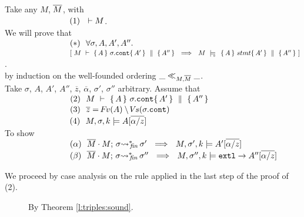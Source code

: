 {\noindent
Take any $M$, $\overline{M}$, with\\ 
$\strut \ \ \hspace{2.3cm} \ \ (1) \ \ \vdash M $.
\\
We will prove that\\
$\strut \ \ \hspace{2.3cm} \ \ (*)\ \ \forall \sigma, A, A', A''.$\\
$\strut \ \ \hspace{2.3cm} \ \ \ \ \  \ \ [ \ M\ \vdash\  \quadruple {A} {\sigma.\prg{cont}} {A'} {A''}  \ \ \Longrightarrow \ \    M\ \modelsD\  \quadruple {A} {stmt} {A'} {A''}\ ]$.\\
by induction on the well-founded ordering  $\_ \ll_{M,\overline{M}}  \_$.
\\
Take $\sigma$, $A$, $A'$, $A''$, $\overline z$, $\overline \alpha$, $\sigma'$, $\sigma''$  arbitrary. Assume that\\
$\strut \ \ \hspace{2.3cm} \ \ (2) \ \ M\ \vdash\  \quadruple {A} {\sigma.\prg{cont}} {A'} {A''}$\\
$\strut \ \ \hspace{2.3cm} \ \ (3) \ \ \overline z = \fv(A)\setminus \vs(\sigma.\prg{cont})$\\
$\strut \ \ \hspace{2.3cm} \ \ (4) \ \ \satDAssertFrom M  \sigma k   A[\overline{\alpha/z}]$\\
To show\\
$\strut \ \ \hspace{2.3cm} \ \ (\alpha) \ \    \leadstoBoundedStarFin {\Mtwo\cdot M}  {\sigma}  {\sigma'}\ \ \Longrightarrow\ \     \satDAssertFrom M  {\sigma'} k   A'[\overline{\alpha/z}]$\\
$\strut \ \ \hspace{2.3cm} \ \ (\beta) \ \    \leadstoBoundedStarFin {\Mtwo\cdot M}  {\sigma}  {\sigma''}\ \ \Longrightarrow\ \     \satDAssertFrom M  {\sigma''}  k  \extThis \rightarrow A''[\overline{\alpha/z}]$
 
 \vspace{.2cm}
\noindent
We proceed by case analysis on the  rule applied in the last step of the proof of (2).

\begin{description} 
 
 \item[{}] 
 
 By Theorem \ref{l:triples:sound}.

\newcommand{\SPS}{\strut \ \ \hspace{0.5cm} \ \ }
 

\end{description}}
